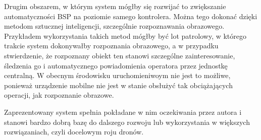 Drugim obszarem, w którym system mógłby się rozwijać to zwiększanie automatyczności BSP na poziomie samego kontrolera. Można tego dokonać dzięki metodom sztucznej inteligencji, szczególnie rozpoznawania obrazowego. Przykładem wykorzystania takich metod mógłby być lot patrolowy, w którego trakcie system dokonywałby rozpoznania obrazowego, a w przypadku stwierdzenie, że rozpoznany obiekt ten stanowi szczególne zainteresowanie, śledzenia go i automatycznego powiadomienia operatora przez jednostkę centralną. W obecnym środowisku uruchomieniwoym nie jest to możliwe, ponieważ urządzenie mobilne nie jest w stanie obsłużyć tak obciążających operacji, jak rozpoznanie obrazowe.

Zaprezentowany system spełnia pokładane w nim oczekiwania przez autora i stanowi bardzo dobrą bazę do dalszego rozwoju lub wykorzystania w większych rozwiązaniach, czyli docelowym roju dronów.


